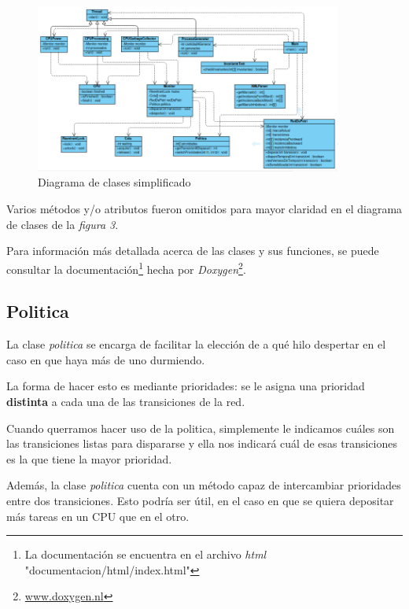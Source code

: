 \documentclass{article}
\newcommand{\fndoc}{La documentación se encuentra en el archivo \emph{html} "documentacion/html/index.html"}
\newcommand{\fndoxy}{\url{www.doxygen.nl}}
\begin{document}
    \begin{figure}[h]
        \includegraphics[width=0.9\textwidth, center]{diagrama-clases.png}
        \caption{Diagrama de clases simplificado}
    \end{figure}
    Varios métodos y/o atributos fueron omitidos para mayor claridad en el diagrama de clases
    de la \emph{figura 3}. \par   
    Para información más detallada acerca de las clases y  sus funciones, se puede consultar
    la documentación\footnote{\fndoc} hecha por \emph{Doxygen}\footnote{\fndoxy}.
    \subsection{Politica}
    La clase \emph{politica} se encarga de facilitar la elección de a qué hilo despertar en 
    el caso en que haya más de uno durmiendo. \par
    La forma de hacer esto es mediante prioridades: se le asigna una prioridad \textbf{distinta}
    a cada una de las transiciones de la red. \par
    Cuando querramos hacer uso de la politica, simplemente le indicamos cuáles son las
    transiciones listas para dispararse y ella nos indicará cuál de esas transiciones es la
    que tiene la mayor prioridad. \par
    Además, la clase \emph{politica} cuenta con un método capaz de intercambiar prioridades
    entre dos transiciones. Esto podría ser útil, en el caso en que se quiera depositar más
    tareas en un CPU que en el otro.
\end{document}
